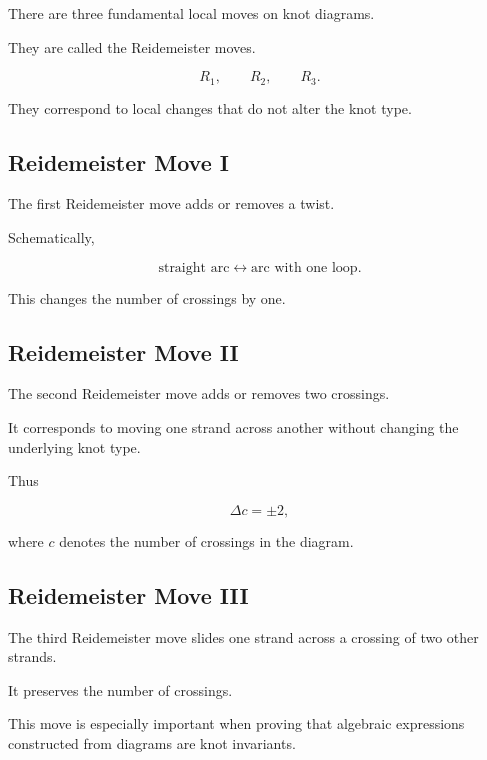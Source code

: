There are three fundamental local moves on knot diagrams.

They are called the Reidemeister moves.

\[
\boxed{
R_1,\qquad R_2,\qquad R_3.
}
\]

They correspond to local changes that do not alter the knot type.

\subsection{Reidemeister Move I}
\label{subsec:reidemeister-one}

The first Reidemeister move adds or removes a twist.

Schematically,

\[
\boxed{
\text{straight arc}
\longleftrightarrow
\text{arc with one loop}.
}
\]

This changes the number of crossings by one.

\subsection{Reidemeister Move II}
\label{subsec:reidemeister-two}

The second Reidemeister move adds or removes two crossings.

It corresponds to moving one strand across another without changing the
underlying knot type.

Thus

\[
\boxed{
\Delta c=\pm2,
}
\]

where \(c\) denotes the number of crossings in the diagram.

\subsection{Reidemeister Move III}
\label{subsec:reidemeister-three}

The third Reidemeister move slides one strand across a crossing of two other
strands.

It preserves the number of crossings.

This move is especially important when proving that algebraic expressions
constructed from diagrams are knot invariants.

